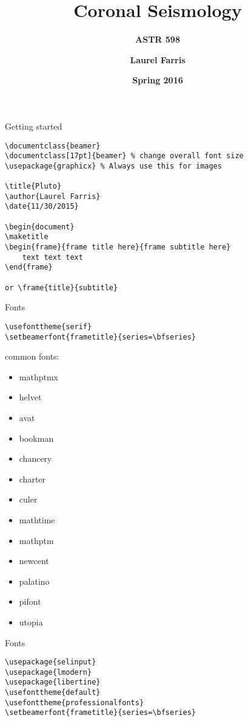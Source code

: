 \documentclass[9pt]{beamer}
\title{\textbf{Coronal Seismology}}
\subtitle{{\bf ASTR 598}}
\date{{\bf Spring 2016}}
\author{\textbf{Laurel Farris}}
\begin{document}
\begin{frame}[fragile=singleslide]{Getting started}
    \begin{verbatim}
\documentclass{beamer}
\documentclass[17pt]{beamer} % change overall font size
\usepackage{graphicx} % Always use this for images

\title{Pluto}
\author{Laurel Farris}
\date{11/30/2015}

\begin{document}
\maketitle
\begin{frame}{frame title here}{frame subtitle here}
    text text text
\end{frame}

or \frame{title}{subtitle}
    \end{verbatim}
\end{frame}%
\begin{frame}[fragile=singleslide]{Fonts}
    \begin{verbatim}
\usefonttheme{serif}
\setbeamerfont{frametitle}{series=\bfseries}
    \end{verbatim}
common fonts:
    \begin{itemize}
        \item mathptmx
        \item helvet
        \item avat
        \item bookman
        \item chancery
        \item charter
        \item culer
        \item mathtime
        \item mathptm
        \item newcent
        \item palatino
        \item pifont
        \item utopia
    \end{itemize}
\end{frame}%
\begin{frame}[fragile=singleslide]{Fonts}
    \begin{verbatim}
\usepackage{selinput}
\usepackage{lmodern}
\usepackage{libertine}
\usefonttheme{default}
\usefonttheme{professionalfonts}
\setbeamerfont{frametitle}{series=\bfseries}
    \end{verbatim}
\end{frame}%
\end{document}
